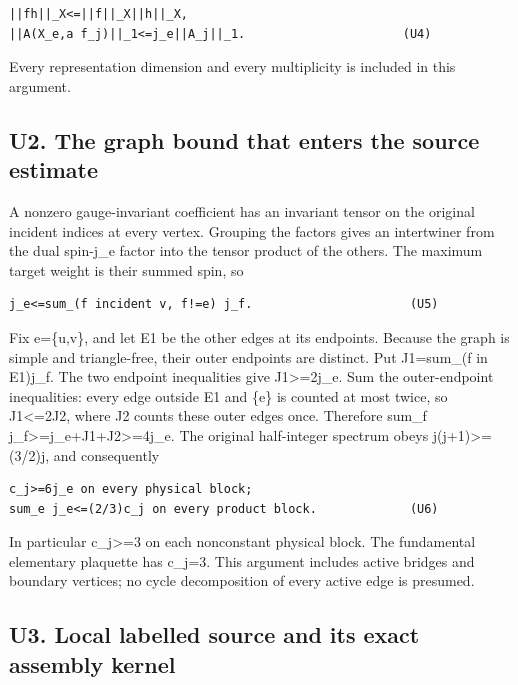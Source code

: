\documentclass[11pt,a4paper]{article}
\renewcommand{\[}{\begingroup\small\originaldisplaystart}
\renewcommand{\]}{\originaldisplayend\endgroup}
\begin{document}
\begin{verbatim}
||fh||_X<=||f||_X||h||_X,
||A(X_e,a f_j)||_1<=j_e||A_j||_1.                      (U4)
\end{verbatim}

Every representation dimension and every multiplicity is included in
this argument.

\subsection{U2. The graph bound that enters the source
estimate}\label{u2.-the-graph-bound-that-enters-the-source-estimate}

A nonzero gauge-invariant coefficient has an invariant tensor on the
original incident indices at every vertex. Grouping the factors gives an
intertwiner from the dual spin-j\_e factor into the tensor product of
the others. The maximum target weight is their summed spin, so

\begin{verbatim}
j_e<=sum_(f incident v, f!=e) j_f.                      (U5)
\end{verbatim}

Fix e=\{u,v\}, and let E1 be the other edges at its endpoints. Because
the graph is simple and triangle-free, their outer endpoints are
distinct. Put J1=sum\_(f in E1)j\_f. The two endpoint inequalities give
J1\textgreater=2j\_e. Sum the outer-endpoint inequalities: every edge
outside E1 and \{e\} is counted at most twice, so J1\textless=2J2, where
J2 counts these outer edges once. Therefore sum\_f
{j\allowbreak{}\_\allowbreak{}f\allowbreak{}\textgreater{}\allowbreak{}=\allowbreak{}j\allowbreak{}\_\allowbreak{}e\allowbreak{}+\allowbreak{}J\allowbreak{}1\allowbreak{}+\allowbreak{}J\allowbreak{}2\allowbreak{}\textgreater{}\allowbreak{}=\allowbreak{}4\allowbreak{}j\allowbreak{}\_\allowbreak{}e\allowbreak{}.\allowbreak{}}
The original half-integer spectrum obeys j(j+1)\textgreater=(3/2)j, and
consequently

\begin{verbatim}
c_j>=6j_e on every physical block;
sum_e j_e<=(2/3)c_j on every product block.             (U6)
\end{verbatim}

In particular c\_j\textgreater=3 on each nonconstant physical block. The
fundamental elementary plaquette has c\_j=3. This argument includes
active bridges and boundary vertices; no cycle decomposition of every
active edge is presumed.

\subsection{U3. Local labelled source and its exact assembly
kernel}\label{u3.-local-labelled-source-and-its-exact-assembly-kernel}
\end{document}
